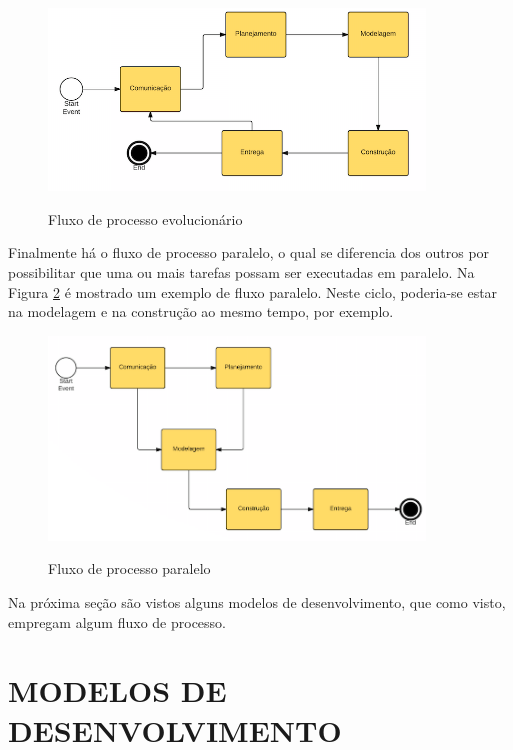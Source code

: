 \begin{figure}[htb!]
\begin{center}
\caption{Fluxo de processo evolucionário}
\label{fig:03}
\includegraphics[width=10cm]{assets/evolucionario} \\
\end{center}
\end{figure}

Finalmente há o fluxo de processo paralelo, o qual se diferencia dos outros por possibilitar que uma ou mais tarefas possam ser executadas em paralelo. Na Figura \ref{fig:04} é mostrado um exemplo de fluxo paralelo. Neste ciclo, poderia-se estar na modelagem e na construção ao mesmo tempo, por exemplo.

\begin{figure}[htb!]
\begin{center}
\caption{Fluxo de processo paralelo}
\label{fig:04}
\includegraphics[width=10cm]{assets/paralelo} \\
\end{center}
\end{figure}

Na próxima seção são vistos alguns modelos de desenvolvimento, que como visto, empregam algum fluxo de processo.

\section{MODELOS DE DESENVOLVIMENTO}


